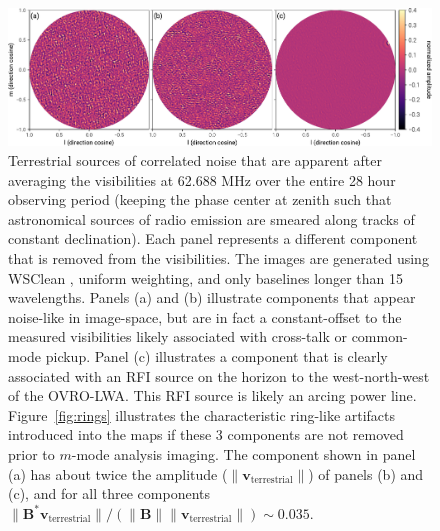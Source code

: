 \documentclass[twocolumn]{aastex61}
\renewcommand{\b}{\pmb}
\begin{document}
\begin{figure}[t]
    \includegraphics[width=\textwidth]{figures/terrestrial-interference/smeared}
    \caption{
        Terrestrial sources of correlated noise that are apparent after averaging the visibilities
        at 62.688 MHz over the entire 28 hour observing period (keeping the phase center at zenith
        such that astronomical sources of radio emission are smeared along tracks of constant
        declination). Each panel represents a different component that is removed from the
        visibilities. The images are generated using WSClean \citep{2014MNRAS.444..606O}, uniform
        weighting, and only baselines longer than 15 wavelengths. Panels (a) and (b) illustrate
        components that appear noise-like in image-space, but are in fact a constant-offset to the
        measured visibilities likely associated with cross-talk or common-mode pickup. Panel (c)
        illustrates a component that is clearly associated with an RFI source on the horizon to the
        west-north-west of the OVRO-LWA. This RFI source is likely an arcing power line.
        Figure~\ref{fig:rings} illustrates the characteristic ring-like artifacts introduced into
        the maps if these 3 components are not removed prior to $m$-mode analysis imaging. The
        component shown in panel (a) has about twice the amplitude ($\|\b v_\text{terrestrial}\|$)
        of panels (b) and (c), and for all three components $\|\b B^*\b v_\text{terrestrial}\|/(\|\b
        B\|\|\b v_\text{terrestrial}\|) \sim 0.035$.
    }
    \label{fig:fitrfi}
\end{figure}
\end{document}
